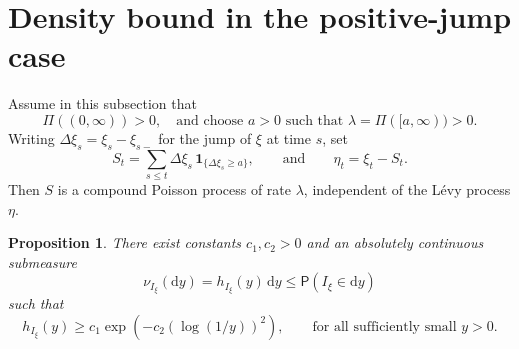 \documentclass[10pt,a4paper]{amsart}
\newtheorem{proposition}[theorem]{Proposition}
\newcommand{\Prob}{\mathsf P}
\newcommand{\1}{\mathbf 1}
\newcommand{\dd}{\mathrm d}
\begin{document}
\section{Density bound in the positive-jump case}
Assume in this subsection that
\[
 \Pi((0,\infty))>0,
 \quad \text{and choose $a>0$ such that }
 \lambda=\Pi([a,\infty))>0.
\]
Writing
$
 \Delta\xi_s=\xi_s-\xi_{s-}
$
for the jump of $\xi$ at time $s$, set
\[
 S_t=\sum_{s\leq t}\Delta\xi_s\,\1_{\{\Delta\xi_s\geq a\}},
 \qquad\text{and}\qquad
 \eta_t=\xi_t-S_t.
\]
Then $S$ is a compound Poisson process of rate $\lambda$, independent of the L\'evy process $\eta$. 


\begin{proposition}\label{prop:group}
There exist constants $c_1, c_2>0$ and an absolutely continuous submeasure
\[
 \nu_{I_\xi}(\dd y)=h_{I_\xi}(y)\,\dd y\leq \Prob(I_\xi\in\dd y)
\]
such that
\begin{equation}\label{eq:hI-lower}
 h_{I_\xi}(y)\geq c_1\exp \left(-c_2(\log(1/y))^2\right),
 \qquad
 \text{for all sufficiently small }y>0.
\end{equation}
\end{proposition}
\end{document}
